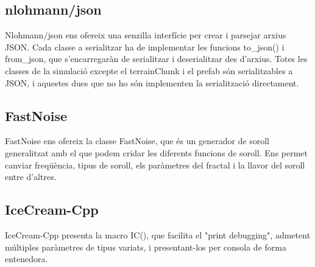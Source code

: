 \subsection{nlohmann/json}
Nlohmann/json ens ofereix una senzilla interfície per crear i parsejar arxius JSON\@. Cada classe a serialitzar ha de implementar les funcions to\_json() i from\_json, que s'encarregaràn de serialitzar i deserialitzar des d'arxius.
Totes les classes de la simulació excepte el terrainChunk i el prefab són serialitzables a JSON, i aquestes dues que no ho són implementen la serialització directament.
\subsection{FastNoise}
FastNoise ens ofereix la classe FastNoise, que és un generador de soroll generalitzat amb el que podem cridar les diferents funcions de soroll. Ens permet canviar freqüència, tipus de soroll, els paràmetres del fractal i la llavor del soroll entre d'altres.
\subsection{IceCream-Cpp}
IceCream-Cpp presenta la macro IC(), que facilita el "print debugging", admetent múltiples paràmetres de tipus variats, i presentant-los per consola de forma entenedora.

